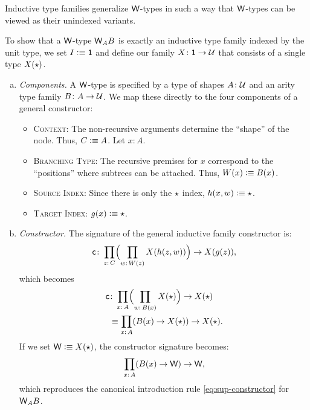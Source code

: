 Inductive type families generalize $\mathsf{W}$-types in such a way that $\mathsf{W}$-types can be viewed as their unindexed variants.

To show that a $\mathsf{W}$-type $\mathsf{W}_AB$ is exactly an inductive type family indexed by the unit type, we set $I\mathrel{\vcentcolon}\equiv\mathsf{1}$ and define our family $X\colon\fun1\to\univ$ that consists of a single type $X({\mathsf{\star}})$.

\begin{enumerate}[a)]
    \item \textit{Components.} A $\mathsf{W}$-type is specified by a type of shapes $A\colon\univ$ and an arity type family $B\colon A\to\univ$. We map these directly to the four components of a general constructor:
    \begin{itemize}
        \item \textsc{Context:} The non-recursive arguments determine the ``shape'' of the node. Thus, $C\mathrel{\vcentcolon}\equiv A$. Let $x\colon A$.
    
        \item \textsc{Branching Type:} The recursive premises for $x$ correspond to the ``positions'' where subtrees can be attached. Thus, $W(x)\mathrel{\vcentcolon}\equiv B(x)$.
    
        \item \textsc{Source Index:} Since there is only the ${\mathsf{\star}}$ index, $h(x,w)\mathrel{\vcentcolon}\equiv{\mathsf{\star}}$.
    
        \item \textsc{Target Index:} $g(x)\mathrel{\vcentcolon}\equiv{\mathsf{\star}}$.
    \end{itemize}

    \item \textit{Constructor.} The signature of the general inductive family constructor is:
    \[
        \fun c\colon\prod_{z\colon C}
            \Bigl(
                \prod_{w\colon W(z)}X(h(z,w))
            \Bigr)
            \to X(g(z)),
    \]
    which becomes
    \begin{align*}
        \fun c&\colon\prod_{x\colon A}
            \Bigl(
                \prod_{w\colon B(x)}X(\fstar)
            \Bigr)
            \to X(\fstar)\\
            &\equiv\prod_{x\colon A}(B(x)\to X(\fstar))
                \to X(\fstar).
        \end{align*}
        If we set $\mathsf{W}\mathrel{\vcentcolon}\equiv X({\mathsf{\star}})$, the constructor signature becomes:
    \[
        \prod_{x\colon A}(B(x)\to\fun W)\to\fun W,
    \]
    which reproduces the canonical introduction rule \eqref{eq:sup-constructor} for $\mathsf{W}_AB$.
\end{enumerate}

